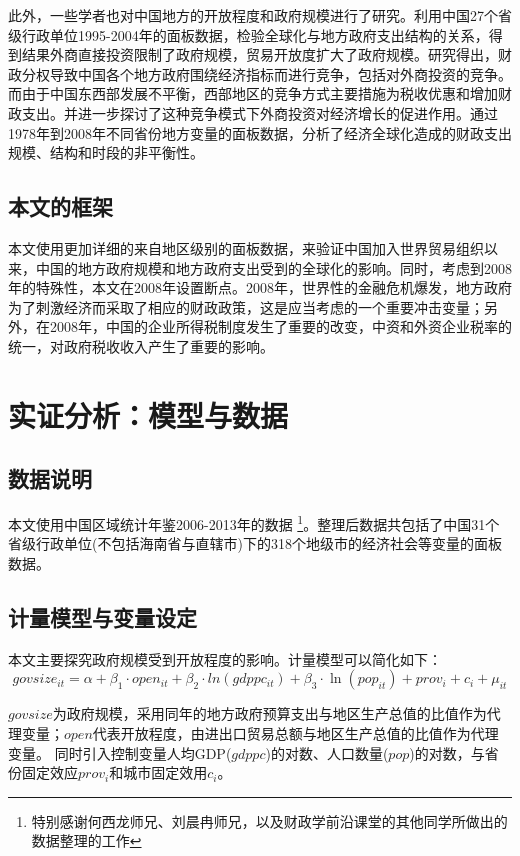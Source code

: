 \documentclass[10pt]{article}
\begin{document}
此外，一些学者也对中国地方的开放程度和政府规模进行了研究。\cite{cai2008}利用中国27个省级行政单位1995-2004年的面板数据，检验全球化与地方政府支出结构的关系，得到结果外商直接投资限制了政府规模，贸易开放度扩大了政府规模。\cite{wang2007}研究得出，财政分权导致中国各个地方政府围绕经济指标而进行竞争，包括对外商投资的竞争。而由于中国东西部发展不平衡，西部地区的竞争方式主要措施为税收优惠和增加财政支出。并进一步探讨了这种竞争模式下外商投资对经济增长的促进作用。\cite{sheng2010}通过1978年到2008年不同省份地方变量的面板数据，分析了经济全球化造成的财政支出规模、结构和时段的非平衡性。
\subsection{本文的框架}
本文使用更加详细的来自地区级别的面板数据，来验证中国加入世界贸易组织以来，中国的地方政府规模和地方政府支出受到的全球化的影响。同时，考虑到2008年的特殊性，本文在2008年设置断点。2008年，世界性的金融危机爆发，地方政府为了刺激经济而采取了相应的财政政策，这是应当考虑的一个重要冲击变量；另外，在2008年，中国的企业所得税制度发生了重要的改变，中资和外资企业税率的统一，对政府税收收入产生了重要的影响。

\section{实证分析：模型与数据}
\subsection{数据说明}
本文使用中国区域统计年鉴2006-2013年的数据
\footnote{特别感谢何西龙师兄、刘晨冉师兄，以及财政学前沿课堂的其他同学所做出的数据整理的工作}。整理后数据共包括了中国31个省级行政单位(不包括海南省与直辖市)下的318个地级市的经济社会等变量的面板数据。
\subsection{计量模型与变量设定}
本文主要探究政府规模受到开放程度的影响。计量模型可以简化如下：
$$ govsize_{it} = \alpha + \beta_1 \cdot open_{it} + \beta_2 \cdot ln(gdppc_{it}) + \beta_3 \cdot \ln(pop_{it}) + prov_{i} +c_i + \mu_{it}$$


$govsize$为政府规模，采用同年的地方政府预算支出与地区生产总值的比值作为代理变量；$open$代表开放程度，由进出口贸易总额与地区生产总值的比值作为代理变量。
同时引入控制变量人均GDP($gdppc$)的对数、人口数量($pop$)的对数，与省份固定效应$prov_i$和城市固定效用$c_i$。
\end{document}
